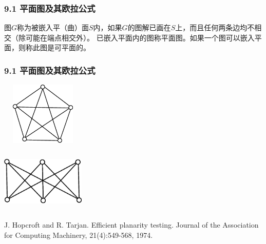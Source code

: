 \documentclass{beamer}
\begin{document}
\begin{CJK}{UTF8}{gbsn}
\begin{frame}
  \frametitle{9.1 平面图及其欧拉公式}
\pause
  \begin{definition9.1.1}
    图$G$称为被嵌入平（曲）面$S$内，如果$G$的图解已画在$S$上，而且任何两条边均不相交（除可能在端点相交外）。
已嵌入平面内的图称平面图。如果一个图可以嵌入平面，则称此图是可平面的。
  \end{definition9.1.1}
\end{frame}

\begin{frame}
  \frametitle{9.1 平面图及其欧拉公式}
  \begin{minipage}{0.45\linewidth}
\includegraphics[width=4cm,height=3cm]{k5}    
  \end{minipage}
\pause
  \begin{minipage}{0.45\linewidth}
    \includegraphics[width=4cm,height=3cm]{k33}
  \end{minipage}
\pause
  \begin{thebibliography}{99}
  J. Hopcroft and R. Tarjan.
\newblock Efficient planarity testing.
\newblock Journal of the Association for Computing Machinery, 21(4):549-568, 1974.
  \end{thebibliography}

\end{frame}
\end{CJK}
\end{document}
